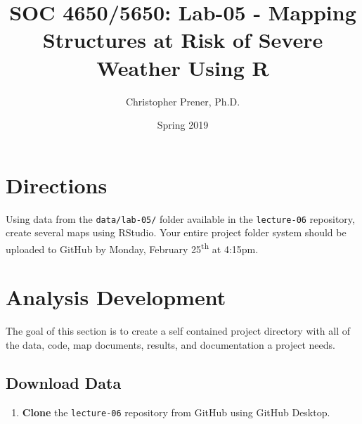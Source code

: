 \documentclass{tufte-handout}
\title{SOC 4650/5650: Lab-05 - Mapping Structures at Risk of Severe Weather Using R}
\author{Christopher Prener, Ph.D.}
\date{Spring 2019}
\begin{document}
\maketitle %

\section{Directions}
Using data from the \texttt{data/lab-05/} folder available in the \texttt{lecture-06} repository, create several maps using RStudio. Your entire project folder system should be uploaded to GitHub by Monday, February 25\textsuperscript{th} at 4:15pm.

\vspace{5mm}
\section{Analysis Development}
The goal of this section is to create a self contained project directory with all of the data, code, map documents, results, and documentation a project needs.

\vspace{3mm}
\subsection{Download Data}
\begin{enumerate}[label=\alph*.]
\item \textbf{Clone} the \texttt{lecture-06} repository from GitHub using GitHub Desktop.
\end{enumerate}

\vspace{3mm}
\end{document}
